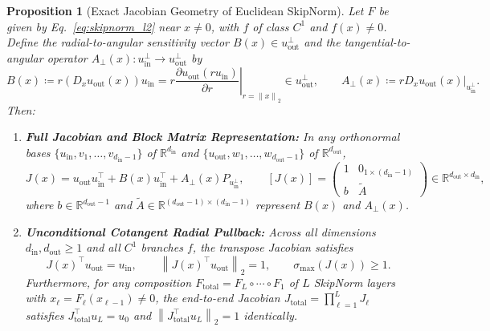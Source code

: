 \documentclass[10pt]{article}
\newtheorem{proposition}{Proposition}
\theoremstyle{definition}
\theoremstyle{remark}
\newcommand{\R}{\mathbb{R}}
\newcommand{\norm}[1]{\left\lVert #1 \right\rVert}
\begin{document}
\begin{proposition}[Exact Jacobian Geometry of Euclidean SkipNorm]
\label{prop:skipnorm_jacobian}
Let $F$ be given by Eq.~\eqref{eq:skipnorm_l2} near $x\ne0$, with $f$ of class $C^1$ and $f(x)\ne0$. Define the radial-to-angular sensitivity vector $B(x) \in u_{\mathrm{out}}^\perp$ and the tangential-to-angular operator $A_{\perp}(x): u_{\mathrm{in}}^\perp \to u_{\mathrm{out}}^\perp$ by
\begin{equation}
    B(x) \coloneqq r (D_x u_{\mathrm{out}}(x)) u_{\mathrm{in}} = \left. r \frac{\partial u_{\mathrm{out}}(r u_{\mathrm{in}})}{\partial r} \right|_{r = \norm{x}_2} \in u_{\mathrm{out}}^\perp, \qquad A_{\perp}(x) \coloneqq \left. r D_x u_{\mathrm{out}}(x) \right|_{u_{\mathrm{in}}^\perp}.
    \label{eq:B_and_Aperp}
\end{equation}
Then:
\begin{enumerate}
    \item[\textbf{(a)}] \textbf{Full Jacobian and Block Matrix Representation:} In any orthonormal bases $\{u_{\mathrm{in}}, v_1, \dots, v_{d_{\mathrm{in}}-1}\}$ of $\R^{d_{\mathrm{in}}}$ and $\{u_{\mathrm{out}}, w_1, \dots, w_{d_{\mathrm{out}}-1}\}$ of $\R^{d_{\mathrm{out}}}$,
    \begin{equation}
        J(x) = u_{\mathrm{out}} u_{\mathrm{in}}^\top + B(x) u_{\mathrm{in}}^\top + A_{\perp}(x) P_{u_{\mathrm{in}}^\perp}, \qquad
        [J(x)] = \begin{pmatrix} 1 & 0_{1 \times (d_{\mathrm{in}}-1)} \\ b & \tilde{A} \end{pmatrix} \in \R^{d_{\mathrm{out}} \times d_{\mathrm{in}}},
        \label{eq:jacobian_block}
    \end{equation}
    where $b \in \R^{d_{\mathrm{out}}-1}$ and $\tilde{A} \in \R^{(d_{\mathrm{out}}-1)\times (d_{\mathrm{in}}-1)}$ represent $B(x)$ and $A_\perp(x)$.
    \item[\textbf{(b)}] \textbf{Unconditional Cotangent Radial Pullback:} Across all dimensions $d_{\mathrm{in}}, d_{\mathrm{out}} \ge 1$ and all $C^1$ branches $f$, the transpose Jacobian satisfies
    \begin{equation}
        J(x)^\top u_{\mathrm{out}} = u_{\mathrm{in}}, \qquad \norm{J(x)^\top u_{\mathrm{out}}}_2 = 1, \qquad \sigma_{\max}(J(x)) \ge 1.
        \label{eq:cotangent_pullback}
    \end{equation}
    Furthermore, for any composition $F_{\mathrm{total}} = F_L \circ \cdots \circ F_1$ of $L$ SkipNorm layers with $x_\ell = F_\ell(x_{\ell-1}) \neq 0$, the end-to-end Jacobian $J_{\mathrm{total}} = \prod_{\ell=1}^L J_\ell$ satisfies $J_{\mathrm{total}}^\top u_L = u_0$ and $\norm{J_{\mathrm{total}}^\top u_L}_2 = 1$ identically.

\end{enumerate}
\end{proposition}
\end{document}

